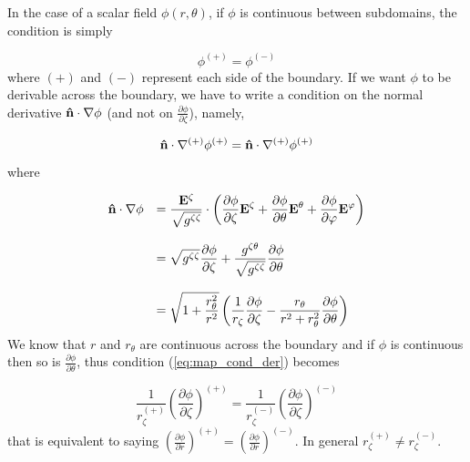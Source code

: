 In the case of a scalar field $\phi(r,\theta)$, if $\phi$ is continuous
between subdomains, the condition is simply

\begin{equation}
\phi^{(+)}=\phi^{(-)}
\end{equation}
where $(+)$ and $(-)$ represent each side of the boundary. If we want
$\phi$ to be derivable across the boundary, we have to write a condition
on the normal derivative $\mathbf{\hat n}\cdot\nabla\phi$ (and not on
$\frac{\partial\phi}{\partial\zeta}$), namely,

\begin{equation}
\label{eq:map_cond_der}
\mathbf{\hat n}\cdot\nabla^{(+)}\phi^{(+)}=\mathbf{\hat n}\cdot\nabla^{(+)}\phi^{(+)}
\end{equation}
where 

\begin{equation}
\begin{array}{rl}
\mathbf{\hat n}\cdot\nabla\phi&
\displaystyle =\frac{\mathbf{E}^\zeta}{\sqrt{g^{\zeta\zeta}}}\cdot\left(\frac{\partial\phi}{\partial\zeta}\mathbf{E}^\zeta+
\frac{\partial\phi}{\partial\theta}\mathbf{E}^\theta+\frac{\partial\phi}{\partial\varphi}\mathbf{E}^\varphi\right)\\
&\\&
\displaystyle =\sqrt{g^{\zeta\zeta}}\frac{\partial\phi}{\partial\zeta}+\frac{g^{\zeta\theta}}{\sqrt{g^{\zeta\zeta}}}
\frac{\partial\phi}{\partial\theta}\\
&\\&
\displaystyle =\sqrt{1+\frac{r_\theta^2}{r^2}}\left(\frac{1}{r_\zeta}\frac{\partial\phi}{\partial\zeta}-
\frac{r_\theta}{r^2+r_\theta^2}\frac{\partial\phi}{\partial\theta}\right)
\end{array}
\end{equation}
We know that $r$ and $r_\theta$ are continuous across the boundary and
if $\phi$ is continuous then so is $\frac{\partial\phi}{\partial\theta}$,
thus condition (\ref{eq:map_cond_der}) becomes

\begin{equation}
\frac{1}{r_\zeta^{(+)}}\left(\frac{\partial\phi}{\partial\zeta}\right)^{(+)}=
\frac{1}{r_\zeta^{(-)}}\left(\frac{\partial\phi}{\partial\zeta}\right)^{(-)}
\end{equation}
that is equivalent to saying
$\displaystyle\left(\frac{\partial\phi}{\partial r}\right)^{(+)}=
\left(\frac{\partial\phi}{\partial r}\right)^{(-)}$. In general
$r_\zeta^{(+)}\neq r_\zeta^{(-)}$.

